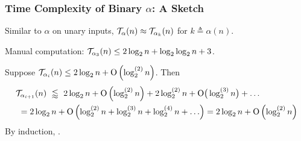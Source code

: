 \begin{frame}
\frametitle{Time Complexity of Binary $\alpha$: A Sketch}

Similar to $\alpha$ on unary inputs, $\mathcal{T}_{\alpha}(n) \approx \mathcal{T}_{\alpha_k}(n)$ for $k\triangleq \alpha(n)$.

\smallskip

\pause
Manual computation: $\mathcal{T}_{\alpha_3}(n)\le 2\log_2n + \log_2\log_2n + 3$.

\smallskip

\pause
Suppose $\mathcal{T}_{\alpha_i}(n) \le 2\log_2n + \text{O}\left(\log_2^{(2)}n\right)$. \pause Then
\begin{equation*}
\begin{aligned}
& \mathcal{T}_{\alpha_{i+1}}(n) \ \lessapprox \ 2\log_2n + \text{O}\left(\log_2^{(2)}n\right) + 2\log_2^{(2)}n + \text{O}\big(\log_2^{(3)}n\big) + \ldots \\
& \ = 2\log_2n + \text{O}\left(\log_2^{(2)}n + \log_2^{(3)}n + \log_2^{(4)}n + \ldots\right)
= 2\log_2n + \text{O}\left(\log_2^{(2)}n\right)
\end{aligned}
\end{equation*}
\pause
By induction, .

\end{frame}